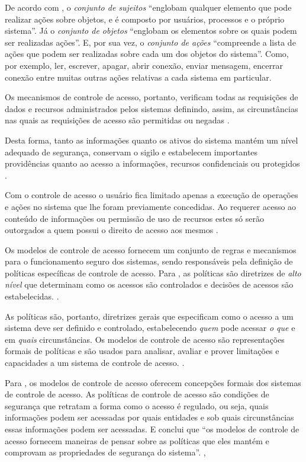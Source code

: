 De acordo com , o \textit{conjunto de sujeitos} ``englobam qualquer elemento que pode realizar ações sobre objetos, e é composto por usuários, processos e o próprio sistema''. Já o \textit{conjunto de objetos} ``englobam os elementos sobre os quais podem ser realizadas ações''. E, por sua vez, o \textit{conjunto de ações} ``compreende a lista de ações que podem ser realizadas sobre cada um dos objetos do sistema''. Como, por exemplo, ler, escrever, apagar, abrir conexão, enviar mensagem, encerrar conexão entre muitas outras ações relativas a cada sistema em particular.

Os mecanismos de controle de acesso, portanto, verificam todas as requisições de dados e recursos administrados pelos sistemas definindo, assim, as circunstâncias nas quais as requisições de acesso são permitidas ou negadas \cite{sandhu:1996}. 

Desta forma, tanto as informações quanto os ativos do sistema mantém um nível adequado de segurança, conservam o sigilo e estabelecem importantes providências quanto ao acesso a informações, recursos confidenciais ou protegidos \cite{wang_conflicts_2010}.

Com o controle de acesso o usuário fica limitado apenas a execução de operações e ações no sistema que lhe foram previamente concedidas. Ao requerer acesso ao conteúdo de informações ou permissão de uso de recursos estes só serão outorgados a quem possui o direito de acesso aos mesmos \cite{ferraiolo_proposed_2001}.

Os modelos de controle de acesso fornecem um conjunto de regras e mecanismos para o funcionamento seguro dos sistemas, sendo responsáveis pela definição de políticas específicas de controle de acesso. Para , as políticas são diretrizes de \textit{alto nível} que determinam como os acessos são controlados e decisões de acessos são estabelecidas. \cite{di_vimercati_policies_2005} \cite{samarati_access_2001} \cite{lopes_adopcao_2012}. 

As políticas são, portanto, diretrizes gerais que especificam como o acesso a um sistema deve ser definido e controlado, estabelecendo \textit{quem} pode acessar \textit{o que} e em \textit{quais} circunstâncias. Os modelos de controle de acesso são representações formais de políticas e são usados para analisar, avaliar e prover limitações e capacidades a um sistema de controle de acesso. \cite{sandhu_access_1994}.

Para , os modelos de controle de acesso oferecem concepções formais dos sistemas de controle de acesso. As políticas de controle de acesso são condições de segurança que retratam a forma como o acesso é regulado, ou seja, quais informações podem ser acessadas por quais entidades e sob quais circunstâncias essas informações podem ser acessadas. E conclui que ``os modelos de controle de acesso fornecem maneiras de pensar sobre as políticas que eles mantém e comprovam as propriedades de segurança do sistema''. \cite[p. 264]{wang_conflicts_2010},

